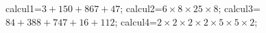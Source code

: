 \documentclass[exercice]{thedocument}%
\begin{document}
%
    \>calcul1=$3+150+867+47$;%
    \>calcul2=$6\times8\times25\times8$;%
    \>calcul3=$84+388+747+16+112$;%
    \>calcul4=$2\times2\times2\times2\times5\times5\times2$;%
\end{document}
